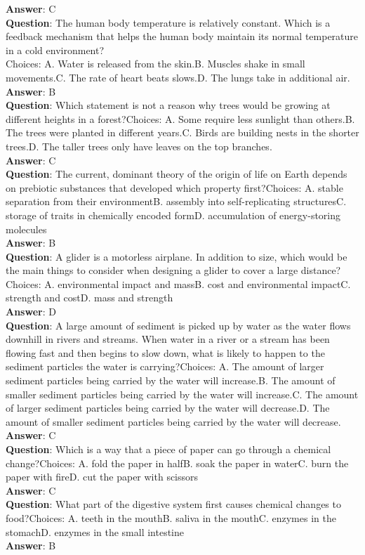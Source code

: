 \textbf{Answer}: C\\
\textbf{Question}: The human body temperature is relatively constant. Which is a feedback mechanism that helps the human body maintain its normal temperature in a cold environment?\\
Choices: A. Water is released from the skin.B. Muscles shake in small movements.C. The rate of heart beats slows.D. The lungs take in additional air.\\
\textbf{Answer}: B\\
\textbf{Question}: Which statement is not a reason why trees would be growing at different heights in a forest?Choices: A. Some require less sunlight than others.B. The trees were planted in different years.C. Birds are building nests in the shorter trees.D. The taller trees only have leaves on the top branches.\\
\textbf{Answer}: C\\
\textbf{Question}: The current, dominant theory of the origin of life on Earth depends on prebiotic substances that developed which property first?Choices: A. stable separation from their environmentB. assembly into self-replicating structuresC. storage of traits in chemically encoded formD. accumulation of energy-storing molecules\\
\textbf{Answer}: B\\
\textbf{Question}: A glider is a motorless airplane. In addition to size, which would be the main things to consider when designing a glider to cover a large distance?Choices: A. environmental impact and massB. cost and environmental impactC. strength and costD. mass and strength\\
\textbf{Answer}: D\\
\textbf{Question}: A large amount of sediment is picked up by water as the water flows downhill in rivers and streams. When water in a river or a stream has been flowing fast and then begins to slow down, what is likely to happen to the sediment particles the water is carrying?Choices: A. The amount of larger sediment particles being carried by the water will increase.B. The amount of smaller sediment particles being carried by the water will increase.C. The amount of larger sediment particles being carried by the water will decrease.D. The amount of smaller sediment particles being carried by the water will decrease.\\
\textbf{Answer}: C\\
\textbf{Question}: Which is a way that a piece of paper can go through a chemical change?Choices: A. fold the paper in halfB. soak the paper in waterC. burn the paper with fireD. cut the paper with scissors\\
\textbf{Answer}: C \\
\textbf{Question}: What part of the digestive system first causes chemical changes to food?Choices: A. teeth in the mouthB. saliva in the mouthC. enzymes in the stomachD. enzymes in the small intestine \\
\textbf{Answer}: B\\

